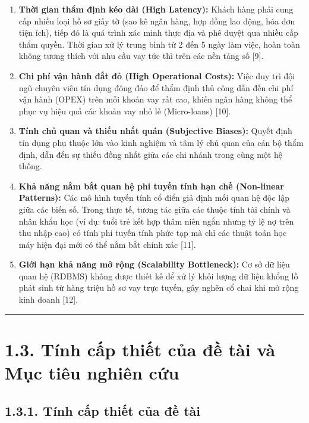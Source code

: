 \documentclass[
  13pt,
  a4paper,
]{report}
\providecommand{\tightlist}{%
  \setlength{\itemsep}{0pt}\setlength{\parskip}{0pt}}
\begin{document}
\begin{enumerate}
\def\labelenumi{\arabic{enumi}.}
\tightlist
\item
  \textbf{Thời gian thẩm định kéo dài (High Latency):} Khách hàng phải
  cung cấp nhiều loại hồ sơ giấy tờ (sao kê ngân hàng, hợp đồng lao
  động, hóa đơn tiện ích), tiếp đó là quá trình xác minh thực địa và phê
  duyệt qua nhiều cấp thẩm quyền. Thời gian xử lý trung bình từ 2 đến 5
  ngày làm việc, hoàn toàn không tương thích với nhu cầu vay tức thì
  trên các nền tảng số {[}9{]}.
\item
  \textbf{Chi phí vận hành đắt đỏ (High Operational Costs):} Việc duy
  trì đội ngũ chuyên viên tín dụng đông đảo để thẩm định thủ công dẫn
  đến chi phí vận hành (OPEX) trên mỗi khoản vay rất cao, khiến ngân
  hàng không thể phục vụ hiệu quả các khoản vay nhỏ lẻ (Micro-loans)
  {[}10{]}.
\item
  \textbf{Tính chủ quan và thiếu nhất quán (Subjective Biases):} Quyết
  định tín dụng phụ thuộc lớn vào kinh nghiệm và tâm lý chủ quan của cán
  bộ thẩm định, dẫn đến sự thiếu đồng nhất giữa các chi nhánh trong cùng
  một hệ thống.
\item
  \textbf{Khả năng nắm bắt quan hệ phi tuyến tính hạn chế (Non-linear
  Patterns):} Các mô hình tuyến tính cổ điển giả định mối quan hệ độc
  lập giữa các biến số. Trong thực tế, tương tác giữa các thuộc tính tài
  chính và nhân khẩu học (ví dụ: tuổi trẻ kết hợp thâm niên ngắn nhưng
  tỷ lệ nợ trên thu nhập cao) có tính phi tuyến tính phức tạp mà chỉ các
  thuật toán học máy hiện đại mới có thể nắm bắt chính xác {[}11{]}.
\item
  \textbf{Giới hạn khả năng mở rộng (Scalability Bottleneck):} Cơ sở dữ
  liệu quan hệ (RDBMS) không được thiết kế để xử lý khối lượng dữ liệu
  khổng lồ phát sinh từ hàng triệu hồ sơ vay trực tuyến, gây nghẽn cổ
  chai khi mở rộng kinh doanh {[}12{]}.
\end{enumerate}

\begin{center}\rule{0.5\linewidth}{0.5pt}\end{center}

\section{1.3. Tính cấp thiết của đề tài và Mục tiêu nghiên
cứu}\label{tuxednh-cux1ea5p-thiux1ebft-cux1ee7a-ux111ux1ec1-tuxe0i-vuxe0-mux1ee5c-tiuxeau-nghiuxean-cux1ee9u}

\subsection{1.3.1. Tính cấp thiết của đề
tài}\label{tuxednh-cux1ea5p-thiux1ebft-cux1ee7a-ux111ux1ec1-tuxe0i}
\end{document}
